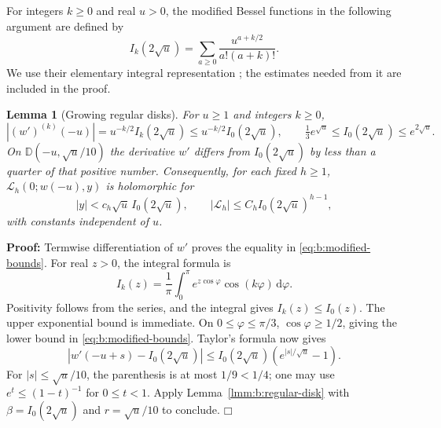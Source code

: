 \documentclass[a4paper,10pt]{article}
\numberwithin{equation}{section}
\newcommand{\dd}{\mathrm{d}}
\theoremstyle{paperplain}
\newtheorem{lmm}[thm]{Lemma}
\theoremstyle{paperremark}
\theoremstyle{paperplain}
\newenvironment{prf}{\noindent \textbf{Proof: }}{\hfill $\mdlgwhtsquare$\par\addvspace{0.5\baselineskip}}
\begin{document}
For integers $k\geq0$ and real $u>0$, the modified Bessel functions
in the following argument are defined by
\begin{equation}\label{eq:b:modified-bessel}
 I_k(2\sqrt u)=\sum_{a\geq0}\frac{u^{a+k/2}}{a!(a+k)!}.
\end{equation}
We use their elementary integral representation
\cite[(10.25.2), (10.32.3)]{DLMF}; the estimates needed from it
are included in the proof.

\begin{lmm}[Growing regular disks]\label{lmm:b:growing-disks}
For $u\geq1$ and integers $k\geq0$,
\begin{equation}\label{eq:b:modified-bounds}
 |(w')^{(k)}(-u)|=u^{-k/2}I_k(2\sqrt u)
                  \leq u^{-k/2}I_0(2\sqrt u),\qquad
 \tfrac13e^{\sqrt u}\leq I_0(2\sqrt u)\leq e^{2\sqrt u}.
\end{equation}
On $\mathbb D(-u,\sqrt u/10)$ the derivative $w'$ differs
from $I_0(2\sqrt u)$ by less than a quarter of that positive
number. Consequently, for each fixed $h\geq1$,
$\mathcal L_h(0;w(-u),y)$ is holomorphic for
\begin{equation}\label{eq:b:growing-radius}
 |y|<c_h\sqrt u\,I_0(2\sqrt u),
 \qquad |\mathcal L_h|\leq C_h I_0(2\sqrt u)^{h-1},
\end{equation}
with constants independent of $u$.
\end{lmm}
\begin{prf}
Termwise differentiation of $w'$ proves the equality in
\eqref{eq:b:modified-bounds}. For real $z>0$, the integral formula
is
\[
 I_k(z)=\frac1\pi\int_0^\pi e^{z\cos\varphi}
                                      \cos(k\varphi)\,\dd\varphi.
\]
Positivity follows from the series, and the integral gives
$I_k(z)\leq I_0(z)$. The upper exponential bound is immediate.
On $0\leq\varphi\leq\pi/3$, $\cos\varphi\geq1/2$, giving the
lower bound in \eqref{eq:b:modified-bounds}.
Taylor's formula now gives
\[
 |w'(-u+s)-I_0(2\sqrt u)|
       \leq I_0(2\sqrt u)(e^{|s|/\sqrt u}-1).
\]
For $|s|\leq\sqrt u/10$, the parenthesis is at most $1/9<1/4$;
one may use $e^t\leq(1-t)^{-1}$ for $0\leq t<1$.
Apply Lemma~\ref{lmm:b:regular-disk} with
$\beta=I_0(2\sqrt u)$ and $r=\sqrt u/10$ to conclude.
\end{prf}
\end{document}
